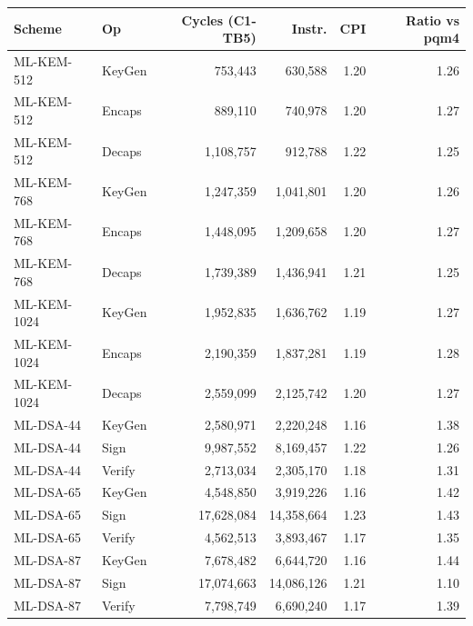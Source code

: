 \begin{tabular}{llrrrr}\toprule
Scheme & Op & Cycles (C1-TB5) & Instr. & CPI & Ratio vs pqm4 \\\midrule
ML-KEM-512 & KeyGen & 753,443 & 630,588 & 1.20 & 1.26 \\
ML-KEM-512 & Encaps & 889,110 & 740,978 & 1.20 & 1.27 \\
ML-KEM-512 & Decaps & 1,108,757 & 912,788 & 1.22 & 1.25 \\
ML-KEM-768 & KeyGen & 1,247,359 & 1,041,801 & 1.20 & 1.26 \\
ML-KEM-768 & Encaps & 1,448,095 & 1,209,658 & 1.20 & 1.27 \\
ML-KEM-768 & Decaps & 1,739,389 & 1,436,941 & 1.21 & 1.25 \\
ML-KEM-1024 & KeyGen & 1,952,835 & 1,636,762 & 1.19 & 1.27 \\
ML-KEM-1024 & Encaps & 2,190,359 & 1,837,281 & 1.19 & 1.28 \\
ML-KEM-1024 & Decaps & 2,559,099 & 2,125,742 & 1.20 & 1.27 \\
ML-DSA-44 & KeyGen & 2,580,971 & 2,220,248 & 1.16 & 1.38 \\
ML-DSA-44 & Sign & 9,987,552 & 8,169,457 & 1.22 & 1.26 \\
ML-DSA-44 & Verify & 2,713,034 & 2,305,170 & 1.18 & 1.31 \\
ML-DSA-65 & KeyGen & 4,548,850 & 3,919,226 & 1.16 & 1.42 \\
ML-DSA-65 & Sign & 17,628,084 & 14,358,664 & 1.23 & 1.43 \\
ML-DSA-65 & Verify & 4,562,513 & 3,893,467 & 1.17 & 1.35 \\
ML-DSA-87 & KeyGen & 7,678,482 & 6,644,720 & 1.16 & 1.44 \\
ML-DSA-87 & Sign & 17,074,663 & 14,086,126 & 1.21 & 1.10 \\
ML-DSA-87 & Verify & 7,798,749 & 6,690,240 & 1.17 & 1.39 \\
\bottomrule
\end{tabular}
